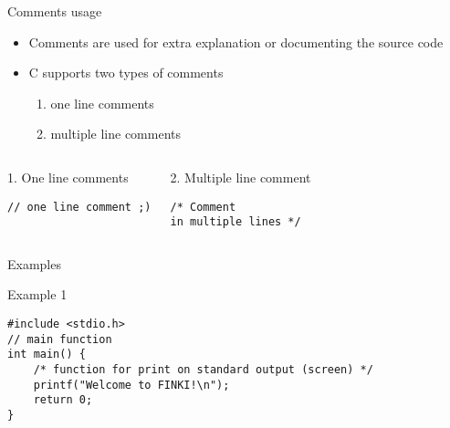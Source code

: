 \begin{frame}[fragile]{Comments usage}
    \begin{itemize}
        \item Comments are used for extra explanation or documenting the source code
        \item C supports two types of comments
        \begin{enumerate}
            \item one line comments
            \item multiple line comments
        \end{enumerate} 
        
    \end{itemize}
        
    \begin{columns}[t]
            \begin{block}{1. One line comments}
                \begin{verbatim}
// one line comment ;)
                \end{verbatim}
            \end{block}
            \begin{block}{2. Multiple line comment}
                \begin{verbatim}
/* Comment
in multiple lines */
                \end{verbatim}
            \end{block}
    \end{columns}       

\end{frame}

\begin{frame}[fragile]{Examples}
    \begin{exampleblock}{Example 1}
        \begin{lstlisting}
#include <stdio.h>
// main function
int main() {
    /* function for print on standard output (screen) */
    printf("Welcome to FINKI!\n");
    return 0;
}
        \end{lstlisting}
    \end{exampleblock}
\end{frame}

